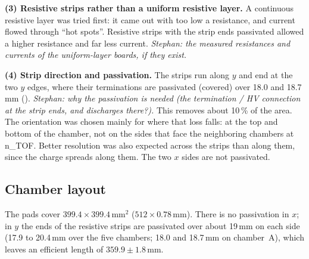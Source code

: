 \textbf{(3) Resistive strips rather than a uniform resistive layer.} A continuous resistive layer was tried
first: it came out with too low a resistance, and current flowed through ``hot spots''. Resistive strips with the
strip ends passivated allowed a higher resistance and far less current. \emph{Stephan: the measured resistances and
currents of the uniform-layer boards, if they exist.}

\textbf{(4) Strip direction and passivation.} The strips run along $y$ and end at the two $y$ edges, where their
terminations are passivated (covered) over 18.0 and 18.7\,mm (). \emph{Stephan: why the
passivation is needed (the termination / HV connection at the strip ends, and discharges there?).} This removes about
10\,\% of the area. The orientation was chosen mainly for where that loss falls: at the top and bottom of the chamber,
not on the sides that face the neighboring chambers at n\_TOF. Better resolution was also expected across the strips
than along them, since the charge spreads along them. The two $x$ sides are not passivated.

\subsection{Chamber layout}
The pads cover $399.4\times399.4$\,mm$^2$ ($512\times0.78$\,mm). There is no passivation in $x$; in $y$ the ends of
the resistive strips are passivated over about 19\,mm on each side (17.9 to 20.4\,mm over the five chambers; 18.0 and
18.7\,mm on chamber~A), which leaves an efficient length of $359.9\pm1.8$\,mm.

